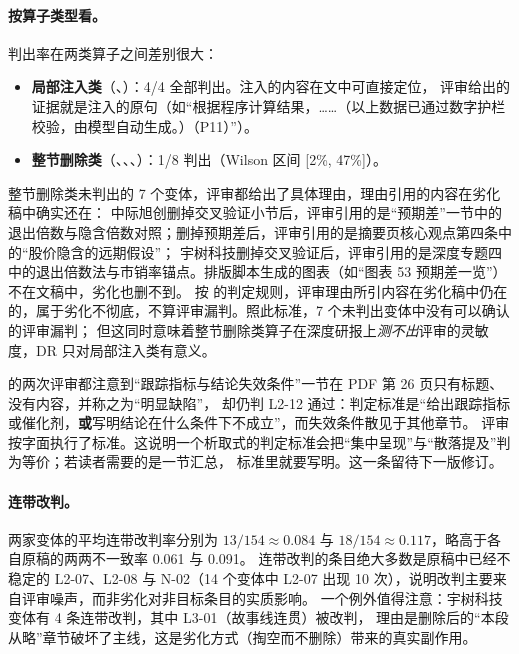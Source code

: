 \paragraph{按算子类型看。}
判出率在两类算子之间差别很大：
\begin{itemize}
  \item \textbf{局部注入类}（、）：4/4 全部判出。注入的内容在文中可直接定位，
        评审给出的证据就是注入的原句（如“根据程序计算结果，……（以上数据已通过数字护栏校验，由模型自动生成。）（P11）”）。
  \item \textbf{整节删除类}（、、、）：1/8 判出（Wilson 区间 [2\%, 47\%]）。
\end{itemize}
整节删除类未判出的 7 个变体，评审都给出了具体理由，理由引用的内容在劣化稿中确实还在：
中际旭创删掉交叉验证小节后，评审引用的是“预期差”一节中的退出倍数与隐含倍数对照；删掉预期差后，评审引用的是摘要页核心观点第四条中的“股价隐含的远期假设”；
宇树科技删掉交叉验证后，评审引用的是深度专题四中的退出倍数法与市销率锚点。排版脚本生成的图表（如“图表 53 预期差一览”）不在文稿中，劣化也删不到。
按  的判定规则，评审理由所引内容在劣化稿中仍在的，属于劣化不彻底，不算评审漏判。照此标准，7 个未判出变体中没有可以确认的评审漏判；
但这同时意味着整节删除类算子在深度研报上\emph{测不出}评审的灵敏度，DR 只对局部注入类有意义。

\begin{failcase}[：评审看见缺陷却判通过]
 的两次评审都注意到“跟踪指标与结论失效条件”一节在 PDF 第 26 页只有标题、没有内容，并称之为“明显缺陷”，
却仍判 L2-12 通过：判定标准是“给出跟踪指标或催化剂，\textbf{或}写明结论在什么条件下不成立”，而失效条件散见于其他章节。
评审按字面执行了标准。这说明一个析取式的判定标准会把“集中呈现”与“散落提及”判为等价；若读者需要的是一节汇总，
标准里就要写明。这一条留待下一版修订。
\end{failcase}

\paragraph{连带改判。}
两家变体的平均连带改判率分别为 $13/154\approx 0.084$ 与 $18/154\approx 0.117$，略高于各自原稿的两两不一致率 0.061 与 0.091。
连带改判的条目绝大多数是原稿中已经不稳定的 L2-07、L2-08 与 N-02（14 个变体中 L2-07 出现 10 次），说明改判主要来自评审噪声，而非劣化对非目标条目的实质影响。
一个例外值得注意：宇树科技  变体有 4 条连带改判，其中 L3-01（故事线连贯）被改判，
理由是删除后的“本段从略”章节破坏了主线，这是劣化方式（掏空而不删除）带来的真实副作用。

